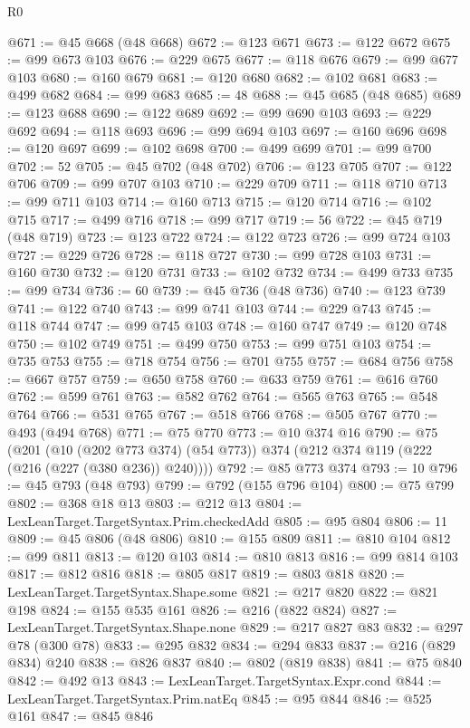 \begin{lexlean}{R0}
\begin{coremodule}
@671 := @45 @668 (@48 @668)
@672 := @123 @671
@673 := @122 @672
@675 := @99 @673 @103
@676 := @229 @675
@677 := @118 @676
@679 := @99 @677 @103
@680 := @160 @679
@681 := @120 @680
@682 := @102 @681
@683 := @499 @682
@684 := @99 @683
@685 := 48
@688 := @45 @685 (@48 @685)
@689 := @123 @688
@690 := @122 @689
@692 := @99 @690 @103
@693 := @229 @692
@694 := @118 @693
@696 := @99 @694 @103
@697 := @160 @696
@698 := @120 @697
@699 := @102 @698
@700 := @499 @699
@701 := @99 @700
@702 := 52
@705 := @45 @702 (@48 @702)
@706 := @123 @705
@707 := @122 @706
@709 := @99 @707 @103
@710 := @229 @709
@711 := @118 @710
@713 := @99 @711 @103
@714 := @160 @713
@715 := @120 @714
@716 := @102 @715
@717 := @499 @716
@718 := @99 @717
@719 := 56
@722 := @45 @719 (@48 @719)
@723 := @123 @722
@724 := @122 @723
@726 := @99 @724 @103
@727 := @229 @726
@728 := @118 @727
@730 := @99 @728 @103
@731 := @160 @730
@732 := @120 @731
@733 := @102 @732
@734 := @499 @733
@735 := @99 @734
@736 := 60
@739 := @45 @736 (@48 @736)
@740 := @123 @739
@741 := @122 @740
@743 := @99 @741 @103
@744 := @229 @743
@745 := @118 @744
@747 := @99 @745 @103
@748 := @160 @747
@749 := @120 @748
@750 := @102 @749
@751 := @499 @750
@753 := @99 @751 @103
@754 := @735 @753
@755 := @718 @754
@756 := @701 @755
@757 := @684 @756
@758 := @667 @757
@759 := @650 @758
@760 := @633 @759
@761 := @616 @760
@762 := @599 @761
@763 := @582 @762
@764 := @565 @763
@765 := @548 @764
@766 := @531 @765
@767 := @518 @766
@768 := @505 @767
@770 := @493 (@494 @768)
@771 := @75 @770
@773 := @10 @374 @16
@790 := @75
    (@201
      (@10 (@202 @773 @374) (@54 @773))
      @374
      (@212 @374 @119 (@222 (@216 (@227 (@380 @236)) @240))))
@792 := @85 @773 @374
@793 := 10
@796 := @45 @793 (@48 @793)
@799 := @792 (@155 @796 @104)
@800 := @75 @799
@802 := @368 @18 @13
@803 := @212 @13
@804 := LexLeanTarget.TargetSyntax.Prim.checkedAdd
@805 := @95 @804
@806 := 11
@809 := @45 @806 (@48 @806)
@810 := @155 @809
@811 := @810 @104
@812 := @99 @811
@813 := @120 @103
@814 := @810 @813
@816 := @99 @814 @103
@817 := @812 @816
@818 := @805 @817
@819 := @803 @818
@820 := LexLeanTarget.TargetSyntax.Shape.some
@821 := @217 @820
@822 := @821 @198
@824 := @155 @535 @161
@826 := @216 (@822 @824)
@827 := LexLeanTarget.TargetSyntax.Shape.none
@829 := @217 @827 @83
@832 := @297 @78 (@300 @78)
@833 := @295 @832
@834 := @294 @833
@837 := @216 (@829 @834) @240
@838 := @826 @837
@840 := @802 (@819 @838)
@841 := @75 @840
@842 := @492 @13
@843 := LexLeanTarget.TargetSyntax.Expr.cond
@844 := LexLeanTarget.TargetSyntax.Prim.natEq
@845 := @95 @844
@846 := @525 @161
@847 := @845 @846

\end{coremodule}
\end{lexlean}
